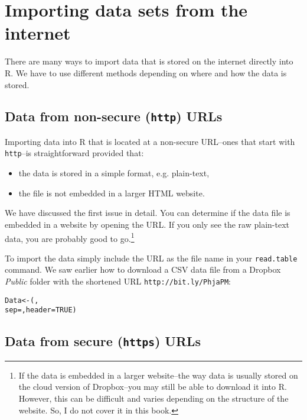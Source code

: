 \section{Importing data sets from the internet}

There are many ways to import data that is stored on the internet directly into R. We have to use different methods depending on where and how the data is stored. 

\subsection{Data from non-secure ({\tt{http}}) URLs}

Importing data into R that is located at a non-secure URL--ones that start with {\tt{http}}--is straightforward provided that:

\begin{itemize}
	\item the data is stored in a simple format, e.g. plain-text,
	\item the file is not embedded in a larger HTML website.
\end{itemize}

We have discussed the first issue in detail. You can determine if the data file is embedded in a website by opening the URL. If you only see the raw plain-text data, you are probably good to go.\footnote{If the data is embedded in a larger website--the way data is usually stored on the cloud version of Dropbox--you may still be able to download it into R. However, this can be difficult and varies depending on the structure of the website. So, I do not cover it in this book.}

To import the data simply include the URL as the file name in your \texttt{read.table} command. We saw earlier how to download a CSV data file from a Dropbox \emph{Public} folder with the shortened URL \texttt{http://bit.ly/PhjaPM}:

\begin{knitrout}
\color{fgcolor}\begin{kframe}
\begin{alltt}
Data <- (, 
					sep = , header = TRUE)
\end{alltt}
\end{kframe}
\end{knitrout}


\subsection{Data from secure ({\tt{https}}) URLs}\label{SecureDataDownload}


